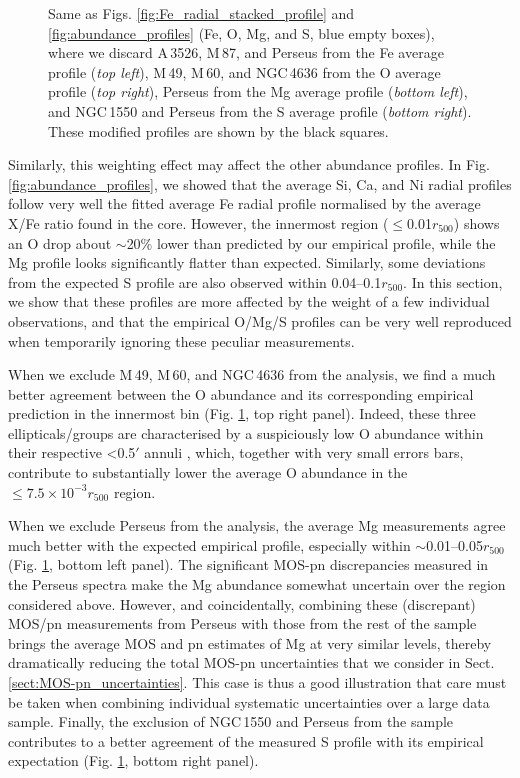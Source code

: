 \documentclass{aa}
\begin{document}
\begin{figure}[!]
        \caption{Same as Figs. \ref{fig:Fe_radial_stacked_profile} and \ref{fig:abundance_profiles} (Fe, O, Mg, and S, blue empty boxes), where we discard A\,3526, M\,87, and Perseus from the Fe average profile (\textit{top left}), M\,49, M\,60, and NGC\,4636 from the O average profile (\textit{top right}), Perseus from the Mg average profile (\textit{bottom left}), and NGC\,1550 and Perseus from the S average profile (\textit{bottom right}). These modified profiles are shown by the black squares.}
\label{fig:excl_profiles}
\end{figure}

Similarly, this weighting effect may affect the other abundance profiles. In Fig. \ref{fig:abundance_profiles}, we showed that the average Si, Ca, and Ni radial profiles follow very well the fitted average Fe radial profile normalised by the average X/Fe ratio found in the core. However, the innermost region ($\le$0.01$r_{500}$) shows an O drop about $\sim$20\% lower than predicted by our empirical profile, while the Mg profile looks significantly flatter than expected. Similarly, some deviations from the expected S profile are also observed within 0.04--0.1$r_{500}$. In this section, we show that these profiles are more affected by the weight of a few individual observations, and that the empirical O/Mg/S profiles can be very well reproduced when temporarily ignoring these peculiar measurements.

When we exclude M\,49, M\,60, and NGC\,4636 from the analysis, we find a much better agreement between the O abundance and its corresponding empirical prediction in the innermost bin (Fig. \ref{fig:excl_profiles}, top right panel). Indeed, these three ellipticals/groups are characterised by a suspiciously low O abundance within their respective <0.5$'$ annuli \citep[inconsistent with the values found within 0.8$'$ with RGS by][]{dePlaa2017}, which, together with very small errors bars, contribute to substantially lower the average O abundance in the $\le 7.5 \times 10^{-3} r_{500}$ region.

When we exclude Perseus from the analysis, the average Mg measurements agree much better with the expected empirical profile, especially within $\sim$0.01--0.05$r_{500}$ (Fig. \ref{fig:excl_profiles}, bottom left panel). The significant MOS-pn discrepancies measured in the Perseus spectra make the Mg abundance somewhat uncertain over the region considered above. However, and coincidentally, combining these (discrepant) MOS/pn measurements from Perseus with those from the rest of the sample brings the average MOS and pn estimates of Mg at very similar levels, thereby dramatically reducing the total MOS-pn uncertainties that we consider in Sect. \ref{sect:MOS-pn_uncertainties}. This case is thus a good illustration that care must be taken when combining individual systematic uncertainties over a large data sample.
Finally, the exclusion of NGC\,1550 and Perseus from the sample contributes to a better agreement of the measured S profile with its empirical expectation (Fig. \ref{fig:excl_profiles}, bottom right panel).
\end{document}
